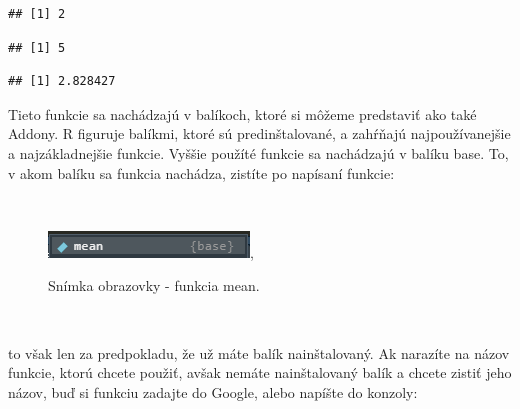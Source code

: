 \begin{verbatim}
## [1] 2
\end{verbatim}

\begin{Shaded}
\begin{Highlighting}[]
\NormalTok{(}\OperatorTok{-}\NormalTok{)}
\end{Highlighting}
\end{Shaded}

\begin{verbatim}
## [1] 5
\end{verbatim}

\begin{Shaded}
\begin{Highlighting}[]
\NormalTok{(}\NormalTok{)}
\end{Highlighting}
\end{Shaded}

\begin{verbatim}
## [1] 2.828427
\end{verbatim}

Tieto funkcie sa nachádzajú v balíkoch, ktoré si môžeme predstaviť ako
také Addony. R figuruje balíkmi, ktoré sú predinštalované, a zahŕňajú
najpoužívanejšie a najzákladnejšie funkcie. Vyššie použíté funkcie sa
nachádzajú v balíku base. To, v akom balíku sa funkcia nachádza, zistíte
po napísaní funkcie:

~

\begin{figure}
\begin{center}
\includegraphics{diplomka obrazky/1.png},
\caption{Snímka obrazovky - funkcia mean.}
\end{center}
\end{figure}
~

to však len za predpokladu, že už máte balík nainštalovaný. Ak narazíte
na názov funkcie, ktorú chcete použiť, avšak nemáte nainštalovaný balík
a chcete zistiť jeho názov, buď si funkciu zadajte do Google, alebo
napíšte do konzoly:

\begin{Shaded}
\begin{Highlighting}[]
\end{Highlighting}
\end{Shaded}

